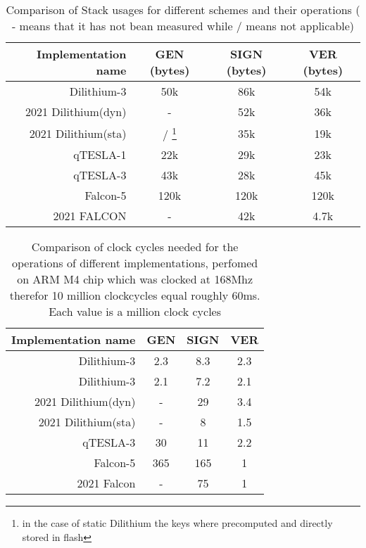 \documentclass[conference]{IEEEtran}
\begin{document}
\begin{table}%
    \caption{Comparison of Stack usages for different schemes and their operations ( - means that it has not bean measured while / means not applicable)}
    \label{t:stack_comp}
    \centering\begin{tabular}{| r | c c c |}
        \hline
        Implementation name                     & GEN (bytes) & SIGN (bytes) & VER (bytes)\\
        \hline
        Dilithium-3 \cite{QR_Iot_Lattice}       & 50k       & 86k   & 54k\\
        2021 Dilithium(dyn)\cite{update_sign}   & -         & 52k   & 36k\\
        2021 Dilithium(sta)\cite{update_sign}   & / \footnote{in the case of static Dilithium the keys where precomputed and directly stored in flash} & 35k   & 19k\\ %
        qTESLA-1 \cite{QR_Iot_Lattice}          & 22k       & 29k   & 23k\\
        qTESLA-3 \cite{QR_Iot_Lattice}          & 43k       & 28k   & 45k\\
        Falcon-5  \cite{QR_Iot_Lattice}         & 120k      & 120k  & 120k\\
        2021 FALCON \cite{update_sign}          & -         & 42k   & 4.7k\\
        \hline
    \end{tabular}
\end{table}

\begin{table}%
    \caption{Comparison of clock cycles needed for the operations of different implementations, perfomed on ARM M4 chip which was clocked at 168Mhz therefor 10 million clockcycles equal roughly 60ms. Each value is a million clock cycles}
    \label{t:clockcycles_comp}
    \centering\begin{tabular}{| r | c c c |}
        \hline
        Implementation name                     & GEN           & SIGN         & VER \\
        \hline
        Dilithium-3 \cite{QR_Iot_Lattice}       & 2.3           & 8.3          & 2.3 \\
        Dilithium-3 \cite{Energy_comp}          & 2.1           & 7.2          & 2.1 \\ %
        2021 Dilithium(dyn)\cite{update_sign}   & -             & 29           & 3.4\\
        2021 Dilithium(sta)\cite{update_sign}   & -             & 8            & 1.5\\
        qTESLA-3 \cite{QR_Iot_Lattice}          & 30            & 11           & 2.2\\
        Falcon-5 \cite{QR_Iot_Lattice}          & 365           & 165          & 1\\
        2021 Falcon  \cite{update_sign}         & -             & 75           & 1\\
        \hline
    \end{tabular}
    
\end{table}
\end{document}
